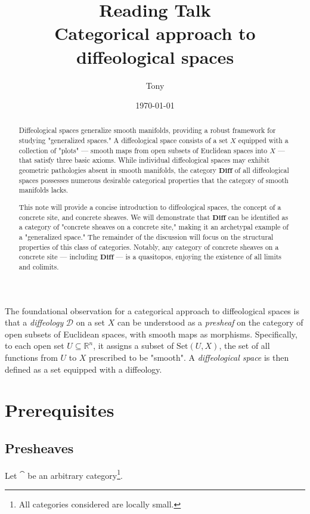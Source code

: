 \documentclass[a4paper,11pt,fleqn]{article}  %
\title{Reading Talk \\ Categorical approach to diffeological spaces}
\author{Tony}
\date{\today}
\begin{document}
\maketitle

\begin{abstract}
Diffeological spaces generalize smooth manifolds, providing a robust framework for studying "generalized spaces." A diffeological space consists of a set $X$ equipped with a collection of "plots" — smooth maps from open subsets of Euclidean spaces into $X$ — that satisfy three basic axioms. While individual diffeological spaces may exhibit geometric pathologies absent in smooth manifolds, the category $\mathbf{Diff}$ of all diffeological spaces possesses numerous desirable categorical properties that the category of smooth manifolds lacks.

This note will provide a concise introduction to diffeological spaces, the concept of a concrete site, and concrete sheaves. We will demonstrate that $\mathbf{Diff}$ can be identified as a category of "concrete sheaves on a concrete site," making it an archetypal example of a "generalized space." The remainder of the discussion will focus on the structural properties of this class of categories. Notably, any category of concrete sheaves on a concrete site — including $\mathbf{Diff}$ — is a quasitopos, enjoying the existence of all limits and colimits.
\end{abstract}


The foundational observation for a categorical approach to diffeological spaces is that a \emph{diffeology} \(\mathcal{D}\) on a set \(X\) can be understood as a \emph{presheaf} on the category of open subsets of Euclidean spaces, with smooth maps as morphisms. Specifically, to each open set \(U \subseteq \mathbb{R}^n\), it assigns a subset of \(\text{Set}(U, X)\), the set of all functions from \(U\) to \(X\) prescribed to be "smooth". 
A \emph{diffeological space} is then defined as a set equipped with a diffeology.





\section{Prerequisites}

\subsection{Presheaves}
Let $\cat$ be an arbitrary category\footnote{All categories considered are locally small.}.
\end{document}
